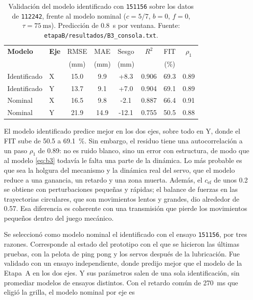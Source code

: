 \begin{table}[!t]
\caption{Validación del modelo identificado con \texttt{151156} sobre los datos de
\texttt{112242}, frente al modelo nominal ($c = 5/7$, $b = 0$, $f = 0$,
$\tau = \SI{75}{\milli\second}$). Predicción de
\SI{0.8}{\second} por ventana. Fuente: \texttt{etapaB/resultados/B3\_consola.txt}.}
\label{tab:validacion}
\centering
\footnotesize
\setlength{\tabcolsep}{3pt}
\begin{tabular}{@{}llS[table-format=2.1]S[table-format=2.1]S[table-format=+2.1]S[table-format=1.3]S[table-format=2.1]S[table-format=1.2]@{}}
\toprule
\textbf{Modelo} & \textbf{Eje} & {RMSE} & {MAE} & {Sesgo} & {$R^2$} & {FIT} & {$\rho_1$} \\
 & & {(\si{\milli\metre})} & {(\si{\milli\metre})} & {(\si{\milli\metre})} & & {(\si{\percent})} & \\
\midrule
Identificado & X & 15.0 & 9.9  & +8.3  & 0.906 & 69.3 & 0.89 \\
Identificado & Y & 13.7 & 9.1  & +7.0  & 0.904 & 69.1 & 0.89 \\
Nominal      & X & 16.5 & 9.8  & -2.1  & 0.887 & 66.4 & 0.91 \\
Nominal      & Y & 21.9 & 14.9 & -12.1 & 0.755 & 50.5 & 0.88 \\
\bottomrule
\end{tabular}
\end{table}

El modelo identificado predice mejor en los dos ejes, sobre todo en Y, donde el FIT sube de
\SI{50.5}{} a \SI{69.1}{\percent}. Sin embargo, el residuo tiene una autocorrelación a un paso
$\rho_1$ de \num{0.89}: no es ruido blanco, sino un error con estructura, de modo que al modelo
\eqref{eq:b3} todavía le falta una parte de la dinámica. Lo más probable es que sea la holgura
del mecanismo y la dinámica real del servo, que el modelo reduce a una ganancia, un retardo y
una zona muerta. Además, el $c_{\mathrm{ef}}$ de unos \num{0.2} se obtiene con perturbaciones
pequeñas y rápidas; el balance de fuerzas en las trayectorias circulares, que son movimientos
lentos y grandes, dio alrededor de \num{0.57}. Esa diferencia es coherente con una transmisión que
pierde los movimientos pequeños dentro del juego mecánico.

Se seleccionó como modelo nominal el identificado con el ensayo \texttt{151156}, por tres
razones. Corresponde al estado del prototipo con el que se hicieron las últimas pruebas, con la
pelota de ping pong y los servos después de la lubricación. Fue validado con un ensayo
independiente, donde predijo mejor que el modelo de la Etapa~A en los dos ejes. Y sus parámetros
salen de una sola identificación, sin promediar modelos de ensayos distintos. Con el retardo
común de \SI{270}{\milli\second} que eligió la grilla, el modelo nominal por eje es

